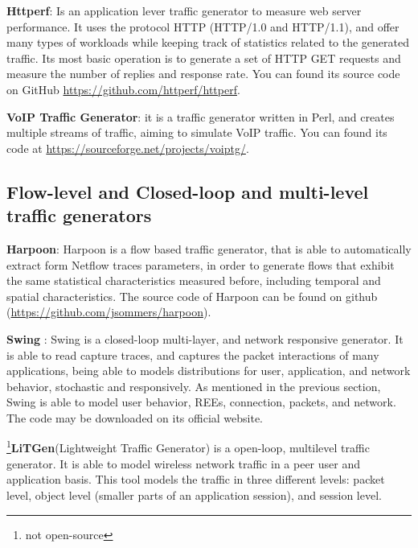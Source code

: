 \textbf{Httperf}\cite{web-httperf}: Is an application lever traffic generator to measure web server performance. It uses the protocol HTTP (HTTP/1.0 and HTTP/1.1), and offer many types of workloads while keeping track of statistics related to the generated traffic. Its most basic operation is to generate a set of HTTP GET requests and measure the number of replies and response rate.  You can found its source code on GitHub \href{https://github.com/httperf/httperf}{https://github.com/httperf/httperf}. 

\textbf{VoIP Traffic Generator}: it is a traffic generator written in Perl, and creates multiple streams of traffic,  aiming to simulate VoIP traffic. You can found its code at \href{
	https://sourceforge.net/projects/voiptg/}{
	https://sourceforge.net/projects/voiptg/}.


\subsection{Flow-level and Closed-loop and multi-level traffic generators}

\textbf{Harpoon}\cite{harpoon-paper}: Harpoon is a flow based traffic generator, that is able to 
automatically extract form Netflow traces parameters, in order to generate flows that exhibit the same statistical characteristics measured before, including temporal and spatial characteristics. The source code of Harpoon can be found on github (\href{https://github.com/jsommers/harpoon}{https://github.com/jsommers/harpoon}).

\textbf{Swing}\cite{swing-paper} \cite{web-swing}: Swing is a closed-loop multi-layer, and network responsive generator. It is able to read capture traces, and captures the packet interactions of many applications, being able to models distributions for user, application, and network behavior, stochastic and responsively. As mentioned in the previous section, Swing is able to model user behavior, REEs, connection, packets, and network. The code may be downloaded on its official website.


\footnote{not open-source}\textbf{LiTGen}(Lightweight Traffic Generator)\cite{litgen-paper} is a open-loop, multilevel traffic generator. It is able to model wireless network traffic in a peer user and application basis. This tool models the traffic in three different levels: packet level, object level (smaller parts of an application session), and session level.



